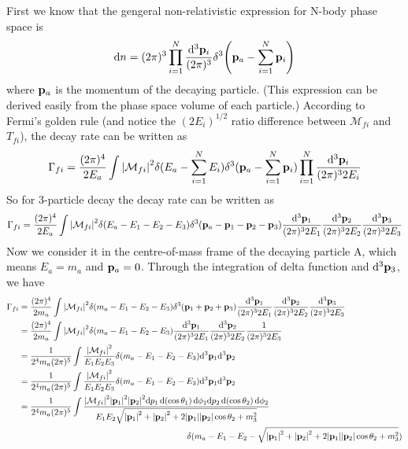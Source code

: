 \documentclass{article}
\begin{document}
First we know that the gengeral non-relativistic expression for N-body phase space is
\begin{align}
  \dd n=(2\pi)^3 \prod_{i=1}^{N}\frac{\dd^3\vb{p}_i}{(2\pi)^3}\delta^3\pqty{\vb{p}_{a}-\sum_{i=1}^{N}\vb{p}_i}
\end{align}
where $\vb{p}_a$ is the momentum of the decaying particle. (This expression can be derived easily from the phase space volume of each particle.) According to Fermi's golden rule (and notice the $(2E_i)^{1/2}$ ratio difference between $\mathcal{M}_{fi}$ and $T_{fi}$), the decay rate can be written as
\begin{align}
  \Gamma_{fi}=\frac{(2\pi)^4}{2E_a}\int\abs{\mathcal{M}_{fi}}^2\delta(E_a-\sum_{i=1}^NE_i)\delta^3(\vb{p}_a-\sum_{i=1}^N\vb{p}_i)\prod_{i=1}^N\frac{\dd^3\vb{p}_i}{(2\pi)^32E_i}
\end{align}
So for 3-particle decay the decay rate can be written as
\begin{align*}
  \Gamma_{fi}=\frac{(2\pi)^4}{2E_a}\int\abs{\mathcal{M}_{fi}}^2\delta(E_a-E_1-E_2-E_3)\delta^3(\vb{p}_a-\vb{p}_1-\vb{p}_2-\vb{p}_3)\frac{\dd^3\vb{p}_1}{(2\pi)^32E_1}\frac{\dd^3\vb{p}_2}{(2\pi)^32E_2}\frac{\dd^3\vb{p}_3}{(2\pi)^32E_3}
\end{align*}
Now we consider it in the centre-of-mass frame of the decaying particle A, which means $E_a=m_a$ and $\vb{p}_a=0$. Through the integration of delta function and $\dd^3\vb{p}_3$, we have
\begin{align*}
  \Gamma_{fi}&=\frac{(2\pi)^4}{2m_a}\int\abs{\mathcal{M}_{fi}}^2\delta(m_a-E_1-E_2-E_3)\delta^3(\vb{p}_1+\vb{p}_2+\vb{p}_3)\frac{\dd^3\vb{p}_1}{(2\pi)^32E_1}\frac{\dd^3\vb{p}_2}{(2\pi)^32E_2}\frac{\dd^3\vb{p}_3}{(2\pi)^32E_3}\\
  &=\frac{(2\pi)^4}{2m_a}\int\abs{\mathcal{M}_{fi}}^2\delta(m_a-E_1-E_2-E_3)\frac{\dd^3\vb{p}_1}{(2\pi)^32E_1}\frac{\dd^3\vb{p}_2}{(2\pi)^32E_2}\frac{1}{(2\pi)^32E_3}\\
  &=\frac{1}{2^4m_a(2\pi)^5}\int\frac{\abs{\mathcal{M}_{fi}}^2}{E_1E_2E_3}\delta(m_a-E_1-E_2-E_3)\dd^3\vb{p}_1\dd^3\vb{p}_2\\
  &=\frac{1}{2^4m_a(2\pi)^5}\int\frac{\abs{\mathcal{M}_{fi}}^2}{E_1E_2E_3}\delta(m_a-E_1-E_2-E_3)\dd^3\vb{p}_1\dd^3\vb{p}_2\\
  &=\frac{1}{2^4m_a(2\pi)^5}\int\frac{\abs{\mathcal{M}_{fi}}^2\abs{\vb{p}_1}^2\abs{\vb{p}_2}^2\dd p_1\dd(\cos\theta_1)\dd\phi_1\dd p_2\dd(\cos\theta_2)\dd\phi_2}{E_1E_2\sqrt{\abs{\vb{p}_1}^2+\abs{\vb{p}_2}^2+2\abs{\vb{p}_1}\abs{\vb{p}_2}\cos\theta_2+m_3^2}}\\
  &\;\;\;\;\;\;\;\;\;\;\;\;\;\;\;\;\;\;\;\;\;\;\;\;\;\;\;\;\;\;\;\;\;\;\;\;\;\;\;\;\;\;\;\;\;\;\;\;\;\;\;\;\;\;\;\;\;\;\;\;\;\;\;\;\;\;\;\;\;\;\;\delta(m_a-E_1-E_2-\sqrt{\abs{\vb{p}_1}^2+\abs{\vb{p}_2}^2+2\abs{\vb{p}_1}\abs{\vb{p}_2}\cos\theta_2+m_3^2})
\end{align*}
\end{document}
